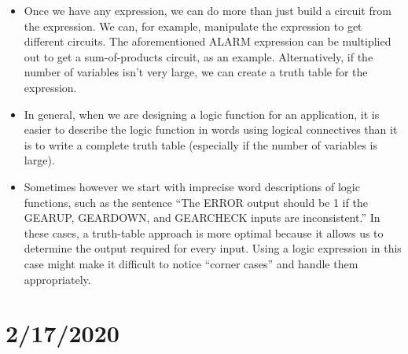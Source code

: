 \documentclass[10pt,a4paper]{article}
\begin{document}
\begin{itemize}
\item Once we have any expression, we can do more than just build a circuit from the expression. We can, for example, manipulate the expression to get different circuits. The aforementioned ALARM expression can be multiplied out to get a sum-of-products circuit, as an example. Alternatively, if the number of variables isn't very large, we can create a truth table for the expression.
\item In general, when we are designing a logic function for an application, it is easier to describe the logic function in words using logical connectives than it is to write a complete truth table (especially if the number of variables is large). 
\item Sometimes however we start with imprecise word descriptions of logic functions, such as the sentence ``The ERROR output should be 1 if the GEARUP, GEARDOWN, and GEARCHECK inputs are inconsistent.'' In these cases, a truth-table approach is more optimal because it allows us to determine the output required for every input. Using a logic expression in this case might make it difficult to notice ``corner cases'' and handle them appropriately. 
\end{itemize}\pagebreak
\section{2/17/2020}
\end{document}
